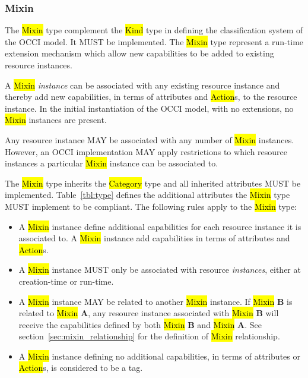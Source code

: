 \documentclass[10pt,a4paper,british]{article}
\begin{document}
\subsubsection{Mixin}
The \hl{Mixin} type complement the \hl{Kind} type in defining the
classification system of the OCCI model. It MUST be implemented. The \hl{Mixin}
type represent a run-time extension mechanism which allow new capabilities to
be added to existing resource instances.

A \hl{Mixin} {\em instance} can be associated with any existing resource
instance and thereby add new capabilities, in terms of attributes and
\hl{Action}s, to the resource instance. In the initial instantiation of the OCCI
model, with no extensions, no \hl{Mixin} instances are present.

Any resource instance MAY be associated with any number of \hl{Mixin}
instances.  However, an OCCI implementation MAY apply restrictions to which
resource instances a particular \hl{Mixin} instance can be associated to.

The \hl{Mixin} type inherits the \hl{Category} type and all inherited
attributes MUST be implemented. Table~\ref{tbl:type} defines the
additional attributes the \hl{Mixin} type MUST implement to be compliant.
The following rules apply to the \hl{Mixin} type:
\begin{itemize}
\item A \hl{Mixin} instance define additional capabilities for each
 resource instance it is associated to. A \hl{Mixin} instance
 add capabilities in terms of attributes and \hl{Action}s.
\item A \hl{Mixin} instance MUST only be associated with resource
 {\em instances}, either at creation-time or run-time.
\item A \hl{Mixin} instance MAY be related to another \hl{Mixin} instance.
 If \hl{Mixin} {\bf B} is related to \hl{Mixin} {\bf A}, any resource instance
 associated with \hl{Mixin} {\bf B} will receive the capabilities defined by
 both \hl{Mixin} {\bf B} and \hl{Mixin} {\bf A}.
 See section~\ref{sec:mixin_relationship} for the definition of \hl{Mixin}
 relationship.
\item A \hl{Mixin} instance defining no additional capabilities, in terms
 of attributes or \hl{Action}s, is considered to be a tag.
\end{itemize}
\end{document}
